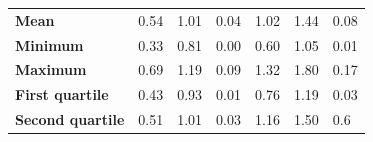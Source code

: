 \documentclass[10pt,a4paper]{report}
\begin{document}
\begin{itemize}
\begin{enumerate}
\begin{table}[h!]
\begin{tabular}{l|llllll}
					\textbf{Mean}                           & 0.54                                                                 & 1.01                                                             & \multicolumn{1}{l|}{0.04}                                                                  & 1.02                                                                 & 1.44                                                             & 0.08                                                                  \\
					\textbf{Minimum}                        & 0.33                                                                 & 0.81                                                             & \multicolumn{1}{l|}{0.00}                                                                  & 0.60                                                                 & 1.05                                                             & 0.01                                                                  \\
					\textbf{Maximum}                        & 0.69                                                                 & 1.19                                                             & \multicolumn{1}{l|}{0.09}                                                                  & 1.32                                                                 & 1.80                                                             & 0.17                                                                  \\ \hline
					\textbf{First quartile}                 & 0.43                                                                 & 0.93                                                             & \multicolumn{1}{l|}{0.01}                                                                  & 0.76                                                                 & 1.19                                                             & 0.03                                                                  \\
					\textbf{Second quartile}                & 0.51                                                                 & 1.01                                                             & \multicolumn{1}{l|}{0.03}                                                                  & 1.16                                                                 & 1.50                                                             & 0.6                                                                  \\

\end{tabular}
\end{table}
\end{enumerate}
\end{itemize}
\end{document}
